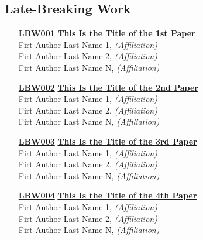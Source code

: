 \subsection{Late-Breaking Work}
\begin{enumerate}
\item[\href{https://doi.org/10.1145/1122445.1122456}{\textbf{LBW001}}]
\href{https://doi.org/10.1145/1122445.1122456}{\textbf{This Is the Title of the 1st Paper}}\\
Firt Author Last Name 1, \emph{(Affiliation)}\\
Firt Author Last Name 2, \emph{(Affiliation)}\\
Firt Author Last Name N, \emph{(Affiliation)}\\

\item[\href{https://doi.org/10.1145/1122445.1122456}{\textbf{LBW002}}]
\href{https://doi.org/10.1145/1122445.1122456}{\textbf{This Is the Title of the 2nd Paper}}\\
Firt Author Last Name 1, \emph{(Affiliation)}\\
Firt Author Last Name 2, \emph{(Affiliation)}\\
Firt Author Last Name N, \emph{(Affiliation)}\\

\item[\href{https://doi.org/10.1145/1122445.1122456}{\textbf{LBW003}}]
\href{https://doi.org/10.1145/1122445.1122456}{\textbf{This Is the Title of the 3rd Paper}}\\
Firt Author Last Name 1, \emph{(Affiliation)}\\
Firt Author Last Name 2, \emph{(Affiliation)}\\
Firt Author Last Name N, \emph{(Affiliation)}\\

\item[\href{https://doi.org/10.1145/1122445.1122456}{\textbf{LBW004}}]
\href{https://doi.org/10.1145/1122445.1122456}{\textbf{This Is the Title of the 4th Paper}}\\
Firt Author Last Name 1, \emph{(Affiliation)}\\
Firt Author Last Name 2, \emph{(Affiliation)}\\
Firt Author Last Name N, \emph{(Affiliation)}\\
\end{enumerate}


